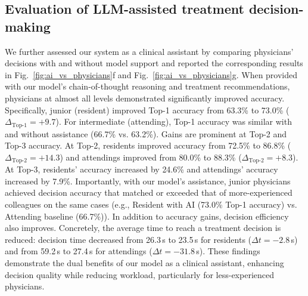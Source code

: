 \documentclass{article}
\begin{document}
\subsection{Evaluation of LLM-assisted treatment decision-making}
We further assessed our system as a clinical assistant by comparing physicians’ decisions with and without model support and reported the corresponding results in Fig.~\ref{fig:ai_vs_physicians}f and Fig.~\ref{fig:ai_vs_physicians}g. When provided with our model’s chain-of-thought reasoning and treatment recommendations, physicians at almost all levels demonstrated significantly improved accuracy. Specifically, junior (resident) improved Top-1 accuracy from 63.3\% to {73.0\%} ($\Delta_{\text{Top-1}}=+9.7$). For intermediate (attending), Top-1 accuracy was similar with and without assistance ({66.7\%} vs. {63.2\%}). Gains are prominent at Top-2 and Top-3 accuracy. At Top-2, residents improved accuracy from {72.5\%} to {86.8\%} ($\Delta_{\text{Top-2}}=+14.3$) and attendings improved from {80.0\%} to {88.3\%} ($\Delta_{\text{Top-2}}=+8.3$). At Top-3, residents’ accuracy increased by {24.6\%} and attendings’ accuracy increased by {7.9\%}. Importantly, with our model’s assistance, junior physicians achieved decision accuracy that matched or exceeded that of more-experienced colleagues on the same cases (e.g., Resident with AI (73.0\% Top-1 accuracy)  vs. Attending baseline (66.7\%)). In addition to accuracy gains, decision efficiency also improves. Concretely, the average time to reach a treatment decision is reduced: decision time decreased from {26.3\,s} to {23.5\,s} for residents ($\Delta t=-2.8$\,s) and from {59.2\,s} to {27.4\,s} for attendings ($\Delta t=-31.8$\,s). These findings demonstrate the dual benefits of our model as a clinical assistant, enhancing decision quality while reducing workload, particularly for less-experienced physicians.
\end{document}
